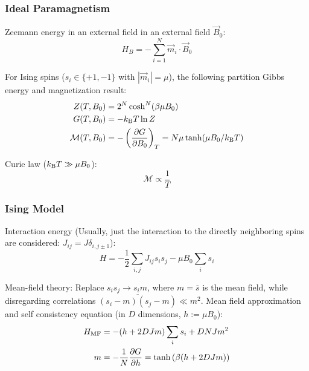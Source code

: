 		\subsubsection{Ideal Paramagnetism}
			\noindent
			Zeemann energy in an external field in an external field $\vec{B}_0$:
			\begin{equation}
				H_B = -\sum_{i=1}^N \vec{m}_i \cdot \vec{B}_0
			\end{equation}

			\noindent
			For Ising spins ($s_i\in\lbrace +1, -1\rbrace$ with $|\vec{m}_i| = \mu$), the following partition Gibbs energy and magnetization result:
			\begin{equation}
				\begin{aligned}
					Z(T,B_0) &= 2^N \cosh^N (\beta\mu B_0) \\
					G(T,B_0) &= -k_{\text{B}} T \ln Z \\
					\mathcal{M}(T,B_0) &= -\left(\pdv{G}{B_0}\right)_T = N\mu \tanh(\mu B_0 /k_{\text{B}} T)
				\end{aligned}
			\end{equation}

			\noindent
			Curie law ($k_{\text{B}} T \gg \mu B_0$):
			\begin{equation}
				\mathcal{M} \propto \frac{1}{T}
			\end{equation}

		\subsubsection{Ising Model}
			\noindent
			Interaction energy (Usually, just the interaction to the directly neighboring spins are considered: $J_{ij} = J \delta_{i,j\pm 1}$):
			\begin{equation}
				H = -\frac{1}{2}\sum_{i,j} J_{ij} s_i s_j -\mu B_0 \sum_i s_i
			\end{equation}

			\noindent
			Mean-field theory: \newline
			Replace $s_i s_j \to s_i m$, where $m = \overline{s}$ is the mean field, while disregarding correlations $\overline{(s_i-m)(s_j-m)}\ll m^2$. \nl
			Mean field approximation and self consistency equation (in $D$ dimensions, $h:=\mu B_0$):
			\begin{equation}
				\begin{aligned}
					H_\text{MF} &= -(h + 2 D J m) \sum_i s_i + D N J m^2 \\
					m &= -\frac{1}{N}\pdv{G}{h} = \tanh\left({\beta(h + 2 D J m)}\right)
				\end{aligned}
			\end{equation}
